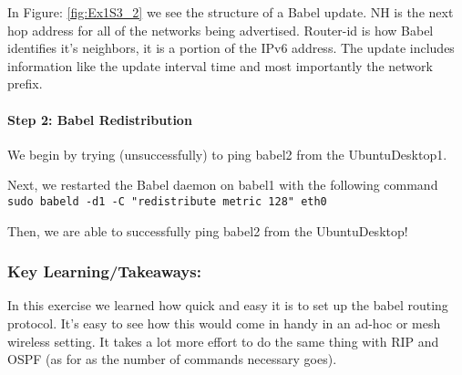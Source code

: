 \documentclass[main.tex]{subfiles}
\begin{document}
In Figure: \ref{fig:Ex1S3_2} we see the structure of a Babel update. NH is the next hop address for all of the networks being advertised. Router-id is how Babel identifies it's neighbors, it is a portion of the IPv6 address. The update includes information like the update interval time and most importantly the network prefix.

\paragraph{Step 2: Babel Redistribution}
\hfill \break
\noindent We begin by trying (unsuccessfully) to ping babel2 from the UbuntuDesktop1.


Next, we restarted the Babel daemon on babel1 with the following command \texttt{sudo babeld -d1 -C "redistribute metric 128" eth0}

Then, we are able to successfully ping babel2 from the UbuntuDesktop!


\subsubsection{Key Learning/Takeaways:}
\hfill \break
\noindent In this exercise we learned how quick and easy it is to set up the babel routing protocol. It's easy to see how this would come in handy in an ad-hoc or mesh wireless setting. It takes a lot more effort to do the same thing with RIP and OSPF (as for as the number of commands necessary goes).
\end{document}
